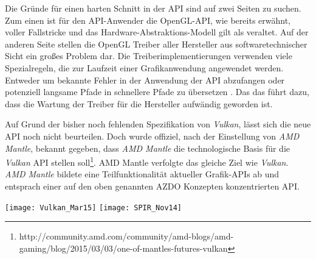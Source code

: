 Die Gründe für einen harten Schnitt in der \ac{API} sind auf zwei Seiten zu suchen. Zum einen ist für den API-Anwender die OpenGL-API, wie bereits erwähnt, voller Fallstricke und das Hardware-Abstraktions-Modell gilt als veraltet. Auf der anderen Seite stellen die  OpenGL Treiber aller Hersteller aus softwaretechnischer Sicht ein großes Problem dar. Die Treiberimplementierungen verwenden viele Spezialregeln, die zur Laufzeit einer Grafikanwendung angewendet werden. Entweder um bekannte Fehler in der Anwendung der API abzufangen oder potenziell langsame Pfade in schnellere Pfade zu übersetzen \parencite{gamedevnet:glnext}. Das das führt dazu, dass die Wartung der Treiber für die Hersteller aufwändig geworden ist.

Auf Grund der bisher noch fehlenden Spezifikation von \textit{Vulkan}, lässt sich die neue API noch nicht beurteilen. Doch wurde offiziel, nach der Einstellung von \textit{AMD Mantle}, bekannt gegeben, dass \textit{AMD Mantle} die technologische Basis für die \textit{Vulkan} \ac{API} stellen soll\footnote{http://community.amd.com/community/amd-blogs/amd-gaming/blog/2015/03/03/one-of-mantles-futures-vulkan}. {AMD Mantle} verfolgte das gleiche Ziel wie \textit{Vulkan}. \textit{AMD Mantle} bildete eine Teilfunktionalität aktueller Grafik-\acp{API} ab und entsprach einer auf den oben genannten \ac{AZDO} Konzepten konzentrierten \ac{API}.

\begin{figure*}
\centering
	\texttt{[image: Vulkan\_Mar15]}
	\texttt{[image: SPIR\_Nov14]}
\end{figure*}


